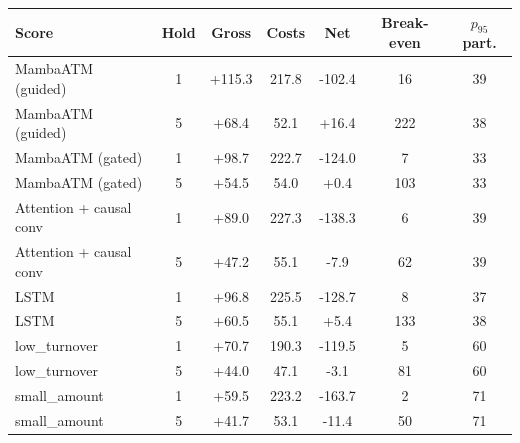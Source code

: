 {\scriptsize
\setlength{\tabcolsep}{2pt}
\begin{tabular}{lcccccc}
\toprule
\textbf{Score} & \textbf{Hold} & \textbf{Gross} & \textbf{Costs} & \textbf{Net} & \textbf{Break-even} & \textbf{$p_{95}$ part.} \\
\midrule
MambaATM (guided) & 1 & +115.3 & 217.8 & -102.4 & 16 & 39 \\
MambaATM (guided) & 5 & +68.4 & 52.1 & +16.4 & 222 & 38 \\
MambaATM (gated) & 1 & +98.7 & 222.7 & -124.0 & 7 & 33 \\
MambaATM (gated) & 5 & +54.5 & 54.0 & +0.4 & 103 & 33 \\
Attention + causal conv & 1 & +89.0 & 227.3 & -138.3 & 6 & 39 \\
Attention + causal conv & 5 & +47.2 & 55.1 & -7.9 & 62 & 39 \\
LSTM & 1 & +96.8 & 225.5 & -128.7 & 8 & 37 \\
LSTM & 5 & +60.5 & 55.1 & +5.4 & 133 & 38 \\
low\_turnover & 1 & +70.7 & 190.3 & -119.5 & 5 & 60 \\
low\_turnover & 5 & +44.0 & 47.1 & -3.1 & 81 & 60 \\
small\_amount & 1 & +59.5 & 223.2 & -163.7 & 2 & 71 \\
small\_amount & 5 & +41.7 & 53.1 & -11.4 & 50 & 71 \\
\bottomrule
\end{tabular}
}
